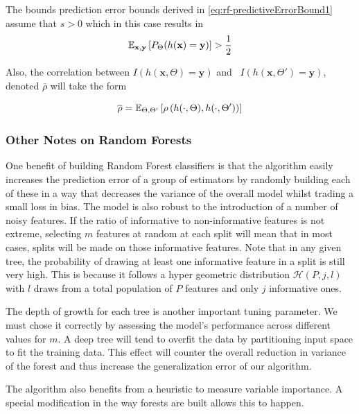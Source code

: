 The bounds prediction error bounds derived in \cref{eq:rf-predictiveErrorBound1} assume that $s >0$ which in this case results in
\begin{equation}
\operatorname{\mathbb{E}}_{\textbf{x},\textbf{y}} \left[ P_{\Theta}(h(\textbf{x}) = \textbf{y}) \right] > \frac{1}{2} 
\end{equation}


Also, the correlation between $I(h(\textbf{x}, \Theta) = \textbf{y})$ and \ $I(h(\textbf{x}, \Theta') = \textbf{y})$, denoted $\overline{\rho}$ will take the form

\begin{equation}
 \overline{\rho} = \operatorname{\mathbb{E}}_{\Theta,\Theta'} \left[ \rho \left( h(\cdot{},\Theta) ,h(\cdot{},\Theta') \right)  \right] 
 \end{equation}

\subsubsection{Other Notes on Random Forests}
One benefit of building Random Forest classifiers is that the algorithm easily increases the prediction error of a group of estimators by randomly building each of these in a way that decreases the variance of the overall model whilst trading a small loss in bias. The model is also robust to the introduction of a number of noisy features. If the ratio of informative to non-informative features is not extreme, selecting $m$ features at random at each split will mean that in most cases, splits will be made on those informative features. Note that in any given tree, the probability of drawing at least one informative feature in a split is still very high. This is because it follows a hyper geometric distribution $\mathcal{H}(P,j,l)$ with $l$ draws from a total population of $P$ features and only $j$ informative ones.

The depth of growth for each tree is another important tuning parameter. We must chose it correctly by assessing the model's performance across different values for $m$. A deep tree will tend to overfit the data by partitioning input space to fit the training data. This effect will counter the overall reduction in variance of the forest and thus increase the generalization error of our algorithm.


The algorithm also benefits from a heuristic to measure variable importance.
A special modification in the way forests are built allows this to happen.

